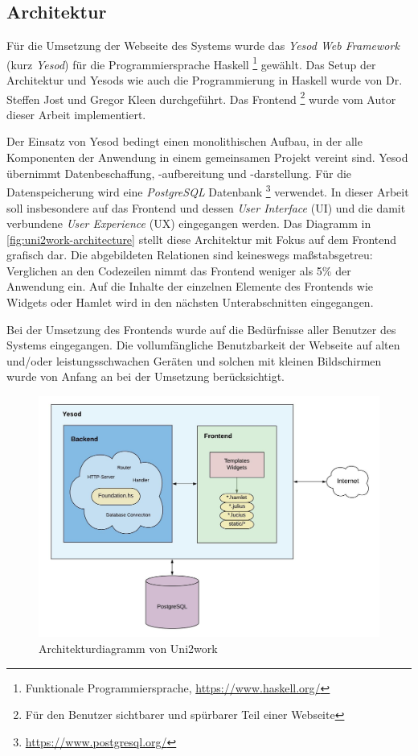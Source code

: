 \documentclass[11pt,a4paper,twoside,ngerman]{article}
\begin{document}
\subsection{Architektur} \label{sec:uni2work-architecture}
Für die Umsetzung der Webseite des Systems wurde das \emph{Yesod Web Framework} (kurz \emph{Yesod}) für die Programmiersprache Haskell \footnote{Funktionale Programmiersprache, \url{https://www.haskell.org/}} gewählt. Das Setup der Architektur und Yesods wie auch die Programmierung in Haskell wurde von Dr. Steffen Jost und Gregor Kleen durchgeführt. Das Frontend \footnote{Für den Benutzer sichtbarer und spürbarer Teil einer Webseite} wurde vom Autor dieser Arbeit implementiert.

Der Einsatz von Yesod bedingt einen monolithischen Aufbau, in der alle Komponenten der Anwendung in einem gemeinsamen Projekt vereint sind. Yesod übernimmt Datenbeschaffung, -aufbereitung und -darstellung. Für die Datenspeicherung wird eine \textit{PostgreSQL} Datenbank \footnote{\url{https://www.postgresql.org/}} verwendet.
In dieser Arbeit soll insbesondere auf das Frontend und dessen \textit{User Interface} (UI) und die damit verbundene \textit{User Experience} (UX) eingegangen werden. Das Diagramm in \autoref{fig:uni2work-architecture} stellt diese Architektur mit Fokus auf dem Frontend grafisch dar. Die abgebildeten Relationen sind keineswegs maßstabsgetreu: Verglichen an den Codezeilen nimmt das Frontend weniger als 5\% der Anwendung ein. Auf die Inhalte der einzelnen Elemente des Frontends wie Widgets oder Hamlet wird in den nächsten Unterabschnitten eingegangen.

Bei der Umsetzung des Frontends wurde auf die Bedürfnisse aller Benutzer des Systems eingegangen. Die vollumfängliche Benutzbarkeit der Webseite auf alten und/oder leistungsschwachen Geräten und solchen mit kleinen Bildschirmen wurde von Anfang an bei der Umsetzung berücksichtigt.

\begin{figure}[h]
    \centering
    \includegraphics[width=\textwidth]{images/uni2work_architecture.jpeg}
    \caption{Architekturdiagramm von Uni2work}
    \label{fig:uni2work-architecture}
\end{figure}
\end{document}
